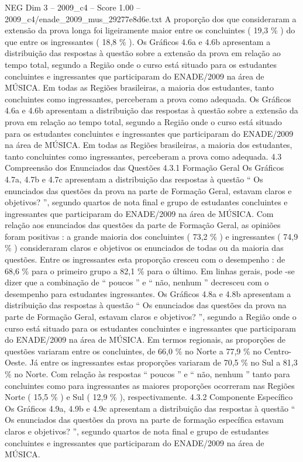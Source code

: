 \begin{textsample}{NEG Dim 3 – 2009\_c4 – Score 1.00 – 2009\_c4/enade\_2009\_mus\_29277e8d6e.txt}
A proporção dos que consideraram a extensão da prova longa foi ligeiramente maior entre os concluintes ( 19,3 \% ) do que entre os ingressantes ( 18,8 \% ).
Os Gráficos 4.6a e 4.6b apresentam a distribuição das respostas à questão sobre a extensão da prova em relação ao tempo total, segundo a Região onde o curso está situado para os estudantes concluintes e ingressantes que participaram do ENADE/2009 na área de MÚSICA.
Em todas as Regiões brasileiras, a maioria dos estudantes, tanto concluintes como ingressantes, perceberam a prova como adequada.
Os Gráficos 4.6a e 4.6b apresentam a distribuição das respostas à questão sobre a extensão da prova em relação ao tempo total, segundo a Região onde o curso está situado para os estudantes concluintes e ingressantes que participaram do ENADE/2009 na área de MÚSICA.
Em todas as Regiões brasileiras, a maioria dos estudantes, tanto concluintes como ingressantes, perceberam a prova como adequada. 4.3 Compreensão dos Enunciados das Questões 4.3.1 Formação Geral Os Gráficos 4.7a, 4.7b e 4.7c apresentam a distribuição das respostas à questão “ Os enunciados das questões da prova na parte de Formação Geral, estavam claros e objetivos? ”, segundo quartos de nota final e grupo de estudantes concluintes e ingressantes que participaram do ENADE/2009 na área de MÚSICA.
Com relação aos enunciados das questões da parte de Formação Geral, as opiniões foram positivas : a grande maioria dos concluintes ( 73,2 \% ) e ingressantes ( 74,9 \% ) consideraram claros e objetivos os enunciados de todas ou da maioria das questões.
Entre os ingressantes esta proporção cresceu com o desempenho : de 68,6 \% para o primeiro grupo a 82,1 \% para o último.
Em linhas gerais, pode -se dizer que a combinação de “ poucos ” e “ não, nenhum ” decresceu com o desempenho para estudantes ingressantes.
Os Gráficos 4.8a e 4.8b apresentam a distribuição das respostas à questão “ Os enunciados das questões da prova na parte de Formação Geral, estavam claros e objetivos? ”, segundo a Região onde o curso está situado para os estudantes concluintes e ingressantes que participaram do ENADE/2009 na área de MÚSICA.
Em termos regionais, as proporções de questões variaram entre os concluintes, de 66,0 \% no Norte a 77,9 \% no Centro-Oeste.
Já entre os ingressantes estas proporções variaram de 70,5 \% no Sul a 81,3 \% no Norte.
Com relação às respostas “ poucos ” e “ não, nenhum ” tanto para concluintes como para ingressantes as maiores proporções ocorreram nas Regiões Norte ( 15,5 \% ) e Sul ( 12,9 \% ), respectivamente. 4.3.2 Componente Específico Os Gráficos 4.9a, 4.9b e 4.9c apresentam a distribuição das respostas à questão “ Os enunciados das questões da prova na parte de formação específica estavam claros e objetivos? ”, segundo quartos de nota final e grupo de estudantes concluintes e ingressantes que participaram do ENADE/2009 na área de MÚSICA.

\end{textsample}
